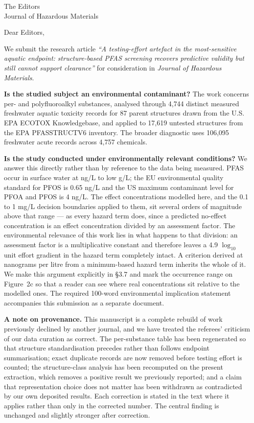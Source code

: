 \documentclass[11pt]{letter}
\begin{document}
\begin{letter}{The Editors\\Journal of Hazardous Materials}
\opening{Dear Editors,}

We submit the research article \textit{``A testing-effort artefact in the
most-sensitive aquatic endpoint: structure-based PFAS screening recovers
predictive validity but still cannot support clearance''} for consideration in
\textit{Journal of Hazardous Materials}.

\textbf{Is the studied subject an environmental contaminant?} The work concerns
per- and polyfluoroalkyl substances, analysed through 4{,}744 distinct measured
freshwater aquatic toxicity records for 87 parent structures drawn from the U.S.
EPA ECOTOX Knowledgebase, and applied to 17{,}619 untested structures from the
EPA PFASSTRUCTV6 inventory. The broader diagnostic uses 106{,}095 freshwater
acute records across 4{,}757 chemicals.

\textbf{Is the study conducted under environmentally relevant conditions?} We
answer this directly rather than by reference to the data being measured. PFAS
occur in surface water at ng/L to low \textmu g/L; the EU environmental quality
standard for PFOS is 0.65 ng/L and the US maximum contaminant level for PFOA and
PFOS is 4 ng/L. The effect concentrations modelled here, and the 0.1 to 1 mg/L
decision boundaries applied to them, sit several orders of magnitude above that
range --- as every hazard term does, since a predicted no-effect concentration
is an effect concentration divided by an assessment factor. The environmental
relevance of this work lies in what happens to that division: an assessment
factor is a multiplicative constant and therefore leaves a 4.9 $\log_{10}$ unit
effort gradient in the hazard term completely intact. A criterion derived at
nanograms per litre from a minimum-based hazard term inherits the whole of it.
We make this argument explicitly in \S3.7 and mark the occurrence range on
Figure~2c so that a reader can see where real concentrations sit relative to the
modelled ones. The required 100-word environmental implication statement
accompanies this submission as a separate document.

\textbf{A note on provenance.} This manuscript is a complete rebuild of work
previously declined by another journal, and we have treated the referees'
criticism of our data curation as correct. The per-substance table has been
regenerated so that structure standardisation precedes rather than follows
endpoint summarisation; exact duplicate records are now removed before testing
effort is counted; the structure-class analysis has been recomputed on the
present extraction, which removes a positive result we previously reported; and
a claim that representation choice does not matter has been withdrawn as
contradicted by our own deposited results. Each correction is stated in the
text where it applies rather than only in the corrected number. The central
finding is unchanged and slightly stronger after correction.


\end{letter}
\end{document}
